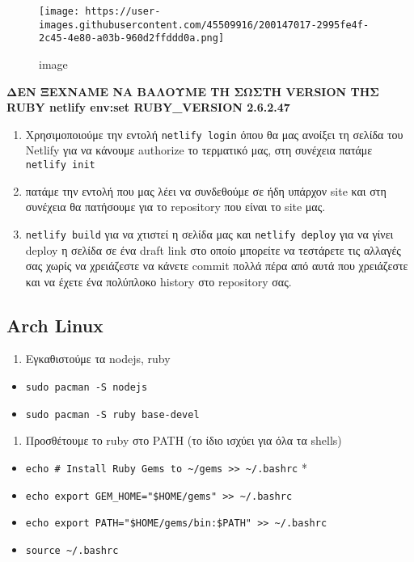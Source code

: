 \documentclass[
]{article}
\begin{document}
\begin{figure}
\centering
\texttt{[image: https://user-images.githubusercontent.com/45509916/200147017-2995fe4f-2c45-4e80-a03b-960d2ffddd0a.png]}
\caption{image}
\end{figure}

\textbf{ΔΕΝ ΞΕΧΝΑΜΕ ΝΑ ΒΑΛΟΥΜΕ ΤΗ ΣΩΣΤΗ VERSION ΤΗΣ RUBY netlify env:set
RUBY\_VERSION 2.6.2.47}

\begin{enumerate}
\item
  Χρησιμοποιούμε την εντολή \texttt{netlify~login} όπου θα μας ανοίξει
  τη σελίδα του Netlify για να κάνουμε authorize το τερματικό μας, στη
  συνέχεια πατάμε \texttt{netlify~init}
\item
  πατάμε την εντολή που μας λέει να συνδεθούμε σε ήδη υπάρχον site και
  στη συνέχεια θα πατήσουμε για το repository που είναι το site μας.
\item
  \texttt{netlify~build} για να χτιστεί η σελίδα μας και
  \texttt{netlify~deploy} για να γίνει deploy η σελίδα σε ένα draft link
  στο οποίο μπορείτε να τεστάρετε τις αλλαγές σας χωρίς να χρειάζεστε να
  κάνετε commit πολλά πέρα από αυτά που χρειάζεστε και να έχετε ένα
  πολύπλοκο history στο repository σας.
\end{enumerate}

\hypertarget{arch-linux}{%
\subsection{Arch Linux}\label{arch-linux}}

\begin{enumerate}
\item
  Εγκαθιστούμε τα nodejs, ruby
\end{enumerate}

\begin{itemize}
\item
  \texttt{sudo~pacman~-S~nodejs}
\item
  \texttt{sudo~pacman~-S~ruby~base-devel}
\end{itemize}

\begin{enumerate}
\item
  Προσθέτουμε το ruby στο PATH (το ίδιο ισχύει για όλα τα shells)
\end{enumerate}

\begin{itemize}
\item
  \texttt{echo~\#~Install~Ruby~Gems~to~\textasciitilde{}/gems~\textgreater{}\textgreater{}~\textasciitilde{}/.bashrc}
  *
\item
  \texttt{echo~export~GEM\_HOME="\$HOME/gems"~\textgreater{}\textgreater{}~\textasciitilde{}/.bashrc}
\item
  \texttt{echo~export~PATH="\$HOME/gems/bin:\$PATH"~\textgreater{}\textgreater{}~\textasciitilde{}/.bashrc}
\item
  \texttt{source~\textasciitilde{}/.bashrc}
\end{itemize}
\end{document}

